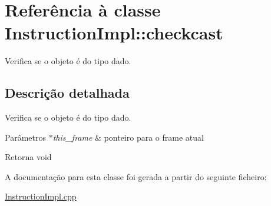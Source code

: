 \hypertarget{class_instruction_impl_1_1checkcast}{}\section{Referência à classe Instruction\+Impl\+:\+:checkcast}
\label{class_instruction_impl_1_1checkcast}


Verifica se o objeto é do tipo dado.  




\subsection{Descrição detalhada}
Verifica se o objeto é do tipo dado. 


\begin{DoxyParams}{Parâmetros}
{\em $\ast$this\+\_\+frame} & ponteiro para o frame atual \\
\hline
\end{DoxyParams}
\begin{DoxyReturn}{Retorna}
void 
\end{DoxyReturn}


A documentação para esta classe foi gerada a partir do seguinte ficheiro\+:\begin{DoxyCompactItemize}
\item 
\hyperlink{_instruction_impl_8cpp}{Instruction\+Impl.\+cpp}\end{DoxyCompactItemize}
